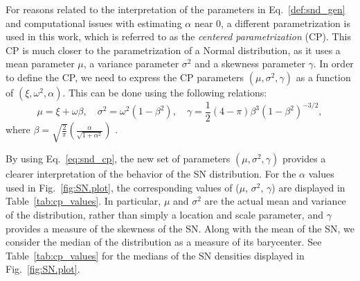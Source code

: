 \documentclass{aa}
\begin{document}
%
For reasons related to the interpretation of the parameters in Eq.~\eqref{def:snd_gen} and computational issues with estimating $\alpha$ near 0, a different parametrization is used in this work, which is referred to as the \emph{centered parametrization} (CP).  This CP is much closer to the parametrization of a Normal distribution, as it uses a mean parameter $\mu$, a variance parameter $\sigma^2$ and a skewness parameter $\gamma$. In order to define the CP, we need to express the CP parameters $(\mu, \sigma^2, \gamma)$ as a function of $(\xi, \omega^2, \alpha)$. This can be done using the following relations:
%
\begin{equation} \label{eq:snd_cp}
\mu = \xi + \omega \beta, \quad \sigma^{2} = \omega^{2}(1-\beta^2), \quad \gamma = \frac{1}{2}(4-\pi) \beta^{3}\left(1-\beta^2\right)^{-3/2},
\end{equation}
%
where $\beta = \sqrt{\frac{2}{\pi}}\left(\frac{\alpha}{\sqrt{1+\alpha^2}}\right)$ \citep[e.g.][]{Arellano-2010}.

By using Eq.~\eqref{eq:snd_cp}, the new set of parameters $(\mu, \sigma^2, \gamma)$ provides a clearer interpretation of the behavior of the SN distribution. For the $\alpha$ values used in Fig.~\ref{fig:SN.plot}, the corresponding values of ($\mu$, $\sigma^2$, $\gamma$) are displayed in Table~\ref{tab:cp_values}.  In particular, $\mu$ and $\sigma^2$ are the actual mean and variance of the distribution, rather than simply a location and scale parameter, and $\gamma$ provides a measure of the skewness of the SN. 
Along with the mean of the SN, we consider the median of the distribution as a measure of its barycenter.  See Table~\ref{tab:cp_values} for the medians of the SN densities displayed in Fig.~\ref{fig:SN.plot}.

%
\end{document}
